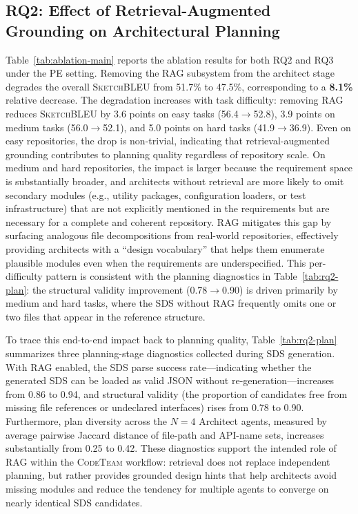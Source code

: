 \documentclass[format=acmsmall, review=false, screen=true]{acmart}
\newcommand{\tool}{\textsc{CodeTeam}\xspace}
\newcommand{\sketchbleu}{\textsc{SketchBLEU}\xspace}
\begin{document}
\subsection{RQ2: Effect of Retrieval-Augmented Grounding on Architectural Planning}
\label{subsec:rq2}

Table~\ref{tab:ablation-main} reports the ablation results for both RQ2 and RQ3 under the PE setting.
Removing the RAG subsystem from the architect stage degrades the overall \sketchbleu from 51.7\% to 47.5\%, corresponding to a \textbf{8.1\%} relative decrease.
The degradation increases with task difficulty: removing RAG reduces \sketchbleu by 3.6 points on easy tasks (56.4$\to$52.8), 3.9 points on medium tasks (56.0$\to$52.1), and 5.0 points on hard tasks (41.9$\to$36.9).
Even on easy repositories, the drop is non-trivial, indicating that retrieval-augmented grounding contributes to planning quality regardless of repository scale.
On medium and hard repositories, the impact is larger because the requirement space is substantially broader, and architects without retrieval are more likely to omit secondary modules (e.g., utility packages, configuration loaders, or test infrastructure) that are not explicitly mentioned in the requirements but are necessary for a complete and coherent repository.
RAG mitigates this gap by surfacing analogous file decompositions from real-world repositories, effectively providing architects with a ``design vocabulary'' that helps them enumerate plausible modules even when the requirements are underspecified.
This per-difficulty pattern is consistent with the planning diagnostics in Table~\ref{tab:rq2-plan}: the structural validity improvement (0.78$\to$0.90) is driven primarily by medium and hard tasks, where the SDS without RAG frequently omits one or two files that appear in the reference structure.

To trace this end-to-end impact back to planning quality, Table~\ref{tab:rq2-plan} summarizes three planning-stage diagnostics collected during SDS generation.
With RAG enabled, the SDS parse success rate---indicating whether the generated SDS can be loaded as valid JSON without re-generation---increases from 0.86 to 0.94, and structural validity (the proportion of candidates free from missing file references or undeclared interfaces) rises from 0.78 to 0.90.
Furthermore, plan diversity across the $N{=}4$ Architect agents, measured by average pairwise Jaccard distance of file-path and API-name sets, increases substantially from 0.25 to 0.42.
These diagnostics support the intended role of RAG within the \tool workflow: retrieval does not replace independent planning, but rather provides grounded design hints that help architects avoid missing modules and reduce the tendency for multiple agents to converge on nearly identical SDS candidates.
\end{document}
